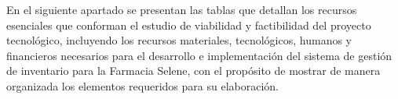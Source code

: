 
\renewcommand{\thesection}{A1.\arabic{section}}
\setcounter{section}{0}

\renewcommand{\tablename}{Tabla}
\setcounter{table}{0}
\renewcommand{\thetable}{A.\arabic{table}}

En el siguiente apartado se presentan las tablas que detallan los recursos esenciales que conforman el estudio de viabilidad y factibilidad del proyecto tecnológico, incluyendo los recursos materiales, tecnológicos, humanos y financieros necesarios para el desarrollo e implementación del sistema de gestión de inventario para la Farmacia Selene, con el propósito de mostrar de manera organizada los elementos requeridos para su elaboración.

